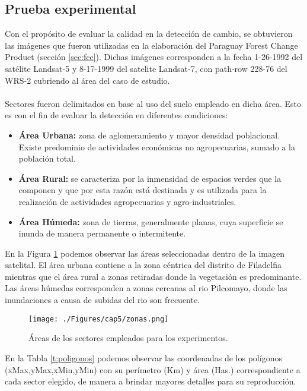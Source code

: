 \subsection{Prueba experimental} 
Con el prop\'osito de evaluar la calidad en la detecci\'on de cambio, se obtuvieron las im\'agenes que fueron utilizadas en la elaboraci\'on del Paraguay Forest Change Product (secci\'on \ref{sec:fcc}). Dichas im\'agenes corresponden a la fecha 1-26-1992	del sat\'elite Landsat-5 y 8-17-1999 del satelite Landsat-7, con path-row 228-76 del WRS-2 cubriendo al \'area del caso de estudio.\\~\\
Sectores fueron delimitados en base al uso del suelo empleado en dicha \'area. Esto es con el fin de evaluar la detecci\'on en diferentes condiciones:
\begin{itemize}
	\item \textbf{\'Area Urbana:} zona de aglomeramiento y mayor densidad poblacional. Existe predominio  de actividades econ\'omicas no agropecuarias, sumado a la poblaci\'on total. 
	\item \textbf{\'Area Rural:} se caracteriza por la inmensidad de espacios verdes que la componen y que por esta razón est\'a destinada y es utilizada para la realizaci\'on de actividades agropecuarias y agro-industriales.
	\item \textbf{\'Area H\'umeda:}	zona de tierras, generalmente planas, cuya superficie se inunda de manera permanente o intermitente.
\end{itemize}
En la Figura \ref{fig:zonasEva} podemos observar las \'areas seleccionadas dentro de la imagen satelital. El \'area urbana contiene a la zona c\'entrica del distrito de Filadelfia mientras que el \'area rural a zonas retiradas donde la vegetaci\'on es predominante. Las \'areas h\'umedas corresponden a zonas cercanas al rio Pilcomayo, donde las inundaciones a causa de subidas del rio son frecuente.   
\begin{figure}[H]
	\centering
	\texttt{[image: ./Figures/cap5/zonas.png]}
	\caption{\'Areas de los sectores empleados para los experimentos.}
	\label{fig:zonasEva}
\end{figure}
En la Tabla \ref{t:poligonos} podemos observar las coordenadas de los pol\'igonos (xMax,yMax,xMin,yMin) con su per\'imetro (Km) y \'area (Has.) correspondiente a cada sector elegido, de manera a brindar mayores detalles para su reproducci\'on.
